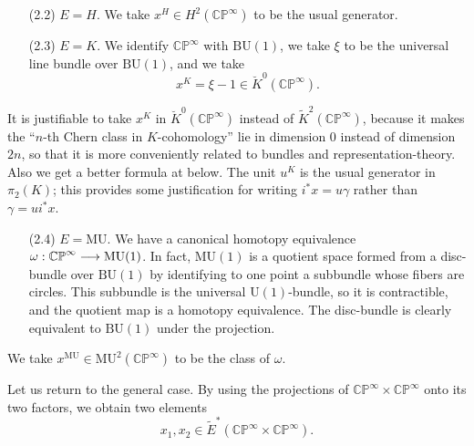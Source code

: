 \documentclass[../main]{subfiles}
\begin{document}
\begin{examples}
\begin{enumerate}
    \item[(2.2)] $E = H$. We take $x^H \in H^2(\mathbb {CP}^\infty)$ to be the usual generator.
    \item[(2.3)] $E = K$. We identify $\mathbb {CP}^\infty$ with $\mathrm{BU}(1)$, we take $\xi$ to be the universal line bundle over $\mathrm{BU}(1)$, and we take $$x^K = \xi - 1 \in {\breve K}^0(\mathbb {CP}^\infty).$$ 
\end{enumerate}

\begin{notes}
It is justifiable to take $x^K$ in ${\breve K}^0(\mathbb {CP}^\infty)$ instead of ${\tilde K}^2(\mathbb {CP}^\infty)$, because it makes the ``$n$-th Chern class in $K$-cohomology'' lie in dimension 0 instead of dimension $2n$, so that it is more conveniently related to bundles and representation-theory. Also we get a better formula at  below. The unit $u^K$ is the usual generator in $\pi_2(K)$; this provides some justification for writing $i^\ast x = u \gamma$ rather than $\gamma = u i^\ast x$.
\end{notes}
\end{examples}

\begin{enumerate}
    \item[(2.4)] $E = \mathrm{MU}$. We have a canonical homotopy equivalence $\omega : \mathbb {CP}^\infty \overset{}{\longrightarrow} \mathrm{MU}(1)$. In fact, $\mathrm{MU}(1)$ is a quotient space formed from a disc-bundle over $\mathrm{BU}(1)$ by identifying to one point a subbundle whose fibers are circles. This subbundle is the universal $\mathrm{U}(1)$-bundle, so it is contractible, and the quotient map is a homotopy equivalence. The disc-bundle is clearly equivalent to $\mathrm{BU}(1)$ under the projection. 
\end{enumerate}

We take $x^{\mathrm{MU}} \in \mathrm {MU}^2(\mathbb {CP}^\infty)$ to be the class of $\omega$. 

Let us return to the general case. By using the projections of $\mathbb {CP}^\infty \times \mathbb {CP}^\infty$ onto its two factors, we obtain two elements $$x_1, x_2 \in {\tilde E}^\ast(\mathbb {CP}^\infty \times \mathbb {CP}^\infty).$$
\end{document}
